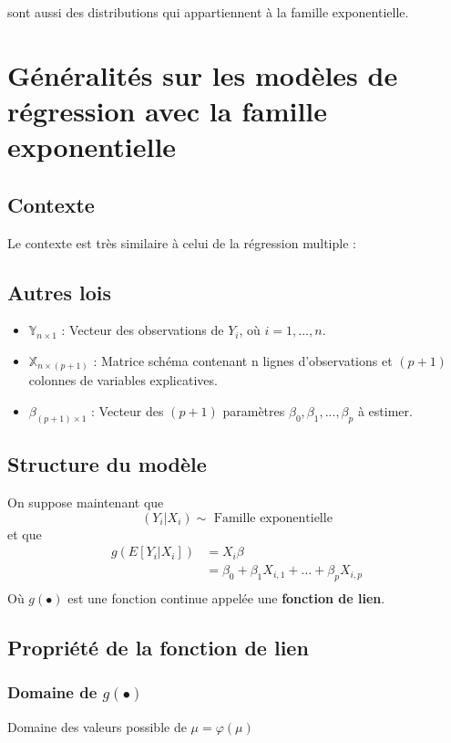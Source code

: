 \documentclass[11pt,french]{report}
\begin{document}
sont aussi des distributions qui appartiennent à la famille exponentielle.

\section{Généralités sur les modèles de régression avec la famille exponentielle}

\subsection{Contexte}
Le contexte est très similaire à celui de la régression multiple :
\subsection{Autres lois}
\begin{itemize}
\item $\mathbb{Y}_{n \times 1}$ : Vecteur des observations de $Y_i$, où $i = 1,...,n$.
\item $\mathbb{X}_{n \times (p+1)}$ : Matrice schéma contenant n lignes d'observations et $(p+1)$ colonnes de variables explicatives.
\item $\mathbb{\beta}_{(p+1) \times 1}$ : Vecteur des $(p+1)$ paramètres $\beta_0, \beta_1,...,\beta_p$ à estimer. 
\end{itemize}

\subsection{Structure du modèle}
On suppose maintenant que 
$$
(Y_i|X_i) \sim \text{ Famille exponentielle}
$$
et que
\begin{align*}
g(E[Y_i|X_i]) &= X_i\beta \\
&= \beta_0 + \beta_1X_{i,1} + ... + \beta_pX_{i,p}\\
\end{align*}
Où $g(\bullet)$ est une fonction continue appelée une \textbf{fonction de lien}.

\subsection{Propriété de la fonction de lien}
\subsubsection{Domaine de $g(\bullet)$}
Domaine des valeurs possible de $\mu = \varphi(\mu)$ \newline
\end{document}
